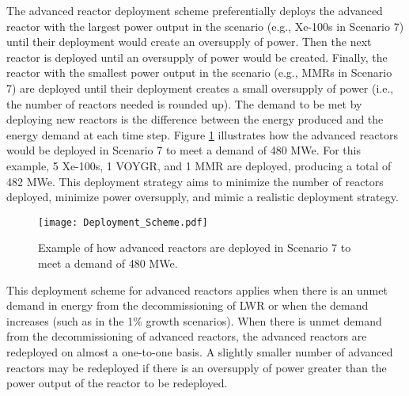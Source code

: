 The advanced reactor deployment scheme
preferentially deploys the advanced reactor with the largest power 
output in the scenario (e.g., Xe-100s in Scenario 7) until their 
deployment would create an oversupply of power. Then the next reactor 
is deployed until an oversupply of power would be created. Finally, the 
reactor 
with the smallest power output in the scenario (e.g., \glspl{MMR} in 
Scenario 7) are deployed until their deployment creates a small oversupply 
of power (i.e., the number of reactors needed is rounded up). The demand 
to be met by deploying new reactors is the difference between the energy 
produced and the energy demand at each time step. 
Figure \ref{fig:AR_deployment} illustrates how the advanced reactors 
would be deployed in Scenario 7 to meet a demand of 480 MWe. For this 
example, 5 Xe-100s, 1 VOYGR, and 1 \gls{MMR} are deployed, producing a 
total of 482 MWe. This deployment 
strategy aims to minimize the number of reactors deployed,  
minimize power oversupply, and mimic a realistic deployment strategy.

\begin{figure}[ht]
    \centering
    \texttt{[image: Deployment\_Scheme.pdf]}
    \caption{Example of how advanced reactors are deployed in Scenario 7 
    to meet a demand of 480 MWe.}
    \label{fig:AR_deployment}
\end{figure}

This deployment scheme for advanced reactors applies when there is an 
unmet demand in energy from the decommissioning of \gls{LWR} or 
when the demand increases (such as in the 1\% growth scenarios). When 
there is unmet demand from the decommissioning of advanced reactors, the 
advanced reactors are redeployed on almost a one-to-one basis. A slightly
smaller number of advanced reactors may be redeployed if there is an 
oversupply of power greater than the power output of the reactor to be 
redeployed. 

